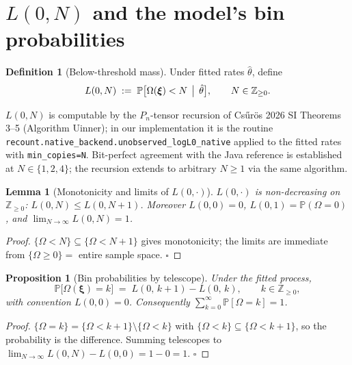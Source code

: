 \documentclass[11pt]{article}
\newcommand{\Z}{\mathbb{Z}}
\newcommand{\PROB}{\mathbb{P}}
\newcommand{\1}{\mathbf{1}}
\newcommand{\Prof}{\boldsymbol{\xi}}
\newcommand{\Om}{\Omega}
\newtheorem{proposition}[theorem]{Proposition}
\newtheorem{lemma}[theorem]{Lemma}
\theoremstyle{definition}
\newtheorem{definition}[theorem]{Definition}
\begin{document}
\section{$L(0,N)$ and the model's bin probabilities}
\label{sec:L0}

\begin{definition}[Below-threshold mass]\label{def:L0}
Under fitted rates $\hat\theta$, define
\begin{equation}
L(0, N)
\;:=\;
\PROB\bigl[\Om(\Prof) < N \,\bigm|\, \hat\theta\bigr],
\qquad N \in \Z_{\ge 0}.
\label{eq:L0-def}
\end{equation}
\end{definition}

$L(0, N)$ is computable by the $P_n$-tensor recursion of
Cs\H{u}r\"os 2026 SI Theorems 3--5 (Algorithm Uinner); in our
implementation it is the routine
\texttt{recount.native\_backend.unobserved\_logL0\_native}
applied to the fitted rates with \texttt{min\_copies=N}. Bit-perfect
agreement with the Java reference is established at $N\in\{1,2,4\}$;
the recursion extends to arbitrary $N \ge 1$ via the same algorithm.

\begin{lemma}[Monotonicity and limits of $L(0,\cdot)$]
$L(0, \cdot)$ is non-decreasing on $\Z_{\ge 0}$:
$L(0, N) \le L(0, N+1)$. Moreover
$L(0, 0) = 0$, $L(0, 1) = \PROB(\Om = 0)$, and
$\lim_{N\to\infty} L(0, N) = 1$.
\end{lemma}
\begin{proof}
$\{\Om < N\} \subseteq \{\Om < N+1\}$ gives monotonicity; the
limits are immediate from $\{\Om \ge 0\} = $ entire sample space.
$\square$
\end{proof}

\begin{proposition}[Bin probabilities by telescope]\label{prop:bins}
Under the fitted process,
\begin{equation}
\PROB\bigl[\Om(\Prof) = k\bigr]
\;=\;
L(0,\, k+1) - L(0,\, k),
\qquad k\in\Z_{\ge 0},
\label{eq:bin-prob}
\end{equation}
with convention $L(0,0)=0$. Consequently
$\sum_{k=0}^\infty \PROB[\Om=k] = 1$.
\end{proposition}
\begin{proof}
$\{\Om = k\} = \{\Om < k+1\} \setminus \{\Om < k\}$ with
$\{\Om < k\} \subseteq \{\Om < k+1\}$, so the probability is the
difference. Summing telescopes to
$\lim_{N\to\infty} L(0, N) - L(0,0) = 1 - 0 = 1$. $\square$
\end{proof}
\end{document}
